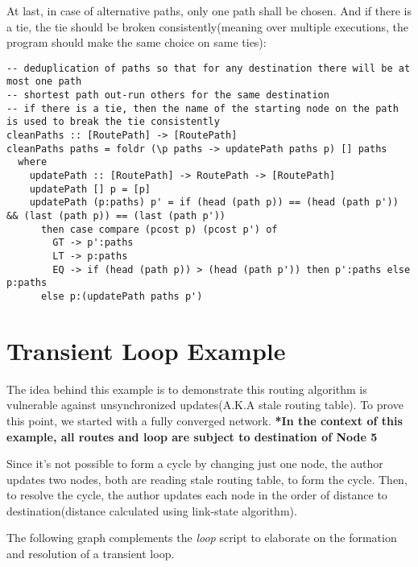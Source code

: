 \documentclass[12pt]{article}
\begin{document}
At last, in case of alternative paths, only one path shall be chosen. And if there is a tie, the tie should be broken consistently(meaning over multiple executions, the program should make the same choice on same ties):
\begin{lstlisting}
-- deduplication of paths so that for any destination there will be at most one path
-- shortest path out-run others for the same destination
-- if there is a tie, then the name of the starting node on the path is used to break the tie consistently
cleanPaths :: [RoutePath] -> [RoutePath]
cleanPaths paths = foldr (\p paths -> updatePath paths p) [] paths
  where
    updatePath :: [RoutePath] -> RoutePath -> [RoutePath]
    updatePath [] p = [p]
    updatePath (p:paths) p' = if (head (path p)) == (head (path p')) && (last (path p)) == (last (path p'))
      then case compare (pcost p) (pcost p') of
        GT -> p':paths
        LT -> p:paths
        EQ -> if (head (path p)) > (head (path p')) then p':paths else p:paths
      else p:(updatePath paths p')
\end{lstlisting}

\section{Transient Loop Example}
The idea behind this example is to demonstrate this routing algorithm is vulnerable against unsynchronized updates(A.K.A stale routing table). To prove this point, we started with a fully converged network.
\textbf{*In the context of this example, all routes and loop are subject to destination of Node 5}

Since it's not possible to form a cycle by changing just one node, the author updates two nodes, both are reading stale routing table, to form the cycle. Then, to resolve the cycle, the author updates each node in the order of distance to destination(distance calculated using link-state algorithm).

The following graph complements the \textit{loop} script to elaborate on the formation and resolution of a transient loop.
\end{document}

